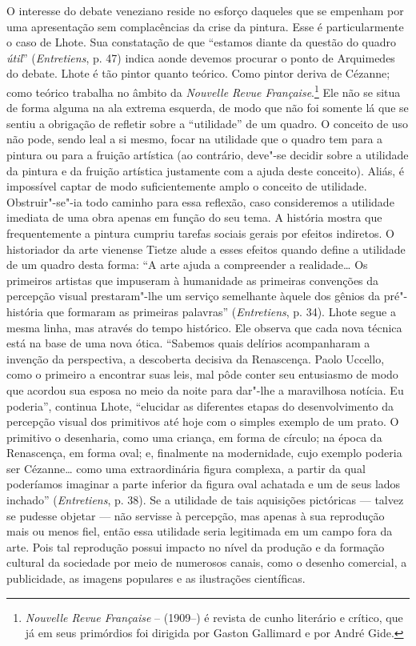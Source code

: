 O interesse do debate veneziano reside no esforço daqueles que se empenham por
uma apresentação sem complacências da crise da pintura. Esse é particularmente o caso
de Lhote. Sua constatação de que ``estamos diante da questão do quadro
\emph{útil}'' (\emph{Entretiens}, p. 47) indica aonde devemos
procurar o ponto de Arquimedes do debate. Lhote é tão pintor quanto
teórico. Como pintor deriva de Cézanne; como teórico trabalha no âmbito
da \emph{Nouvelle Revue Française}.\footnote{\emph{Nouvelle Revue
  Française} --  (1909--) é revista de cunho literário e
  crítico, que já em seus primórdios foi dirigida por Gaston Gallimard e
  por André Gide. \versal{[N.~O.]}} Ele não se situa de forma alguma na ala extrema
esquerda, de modo que não foi somente lá que se sentiu a obrigação de refletir sobre
a ``utilidade'' de um quadro. O conceito de uso não pode, sendo leal a si
mesmo, focar na utilidade que o quadro tem para a pintura ou para a
fruição artística (ao contrário, deve"-se decidir sobre a utilidade da pintura e da fruição artística justamente com a ajuda deste conceito). Aliás, é impossível captar de modo
suficientemente amplo o conceito de utilidade. Obstruir"-se"-ia todo
caminho para essa reflexão, caso consideremos a utilidade imediata de uma
obra apenas em função do seu tema. A história mostra que frequentemente a pintura
cumpriu tarefas sociais gerais por efeitos indiretos.
O historiador da arte vienense Tietze alude a esses efeitos quando define
a utilidade de um quadro desta forma: ``A arte ajuda a compreender a realidade\ldots{}
Os primeiros artistas que impuseram à humanidade as primeiras convenções
da percepção visual prestaram"-lhe um serviço semelhante àquele dos
gênios da pré"-história que formaram as primeiras palavras''
(\emph{Entretiens}, p. 34). Lhote segue a mesma linha, mas através do tempo
histórico. Ele observa que cada nova técnica está na base de uma nova
ótica. ``Sabemos quais delírios acompanharam a invenção da perspectiva,
a descoberta decisiva da Renascença. Paolo Uccello, como o primeiro a
encontrar suas leis, mal pôde conter seu entusiasmo de modo que acordou
sua esposa no meio da noite para dar"-lhe a maravilhosa notícia. Eu
poderia'', continua Lhote, ``elucidar as diferentes etapas do
desenvolvimento da percepção visual dos primitivos até hoje com o
simples exemplo de um prato. O primitivo o desenharia, como uma
criança, em forma de círculo; na época da Renascença, em forma oval; e,
finalmente na modernidade, cujo exemplo poderia ser Cézanne\ldots{} como
uma extraordinária figura complexa, a partir da qual poderíamos
imaginar a parte inferior da figura oval achatada e um de seus lados
inchado'' (\emph{Entretiens}, p. 38). Se a utilidade de tais aquisições
pictóricas --- talvez se pudesse objetar --- não servisse à percepção, mas
apenas à sua reprodução mais ou menos fiel, então essa utilidade seria
legitimada em um campo fora da arte. Pois tal reprodução
possui impacto no nível da produção e da formação cultural da sociedade
por meio de numerosos canais, como o desenho comercial, a
publicidade, as imagens populares e as ilustrações científicas.

